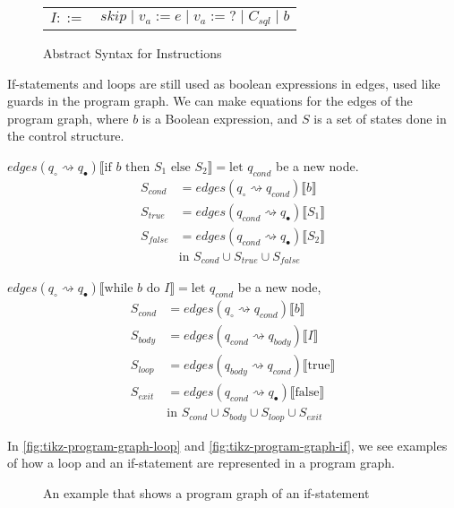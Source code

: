 \begin{figure}
    \center
    \begin{tabular}{r l}
        $I ::=$ & $skip \mid v_a := e \mid v_a := ? \mid C_{sql} \mid b$
    \end{tabular}
    \caption{Abstract Syntax for Instructions}
    \label{tab:abstract-syntax-instructions}
\end{figure}

If-statements and loops are still used as boolean expressions in edges, used like guards in the program graph.
We can make equations for the edges of the program graph, where $b$ is a Boolean expression, and $S$ is a set of states done in the control structure.

$edges(q_{\circ} \rightsquigarrow q_{\bullet})\llbracket \text{if } b \text{ then } S_1 \text{ else } S_2 \rrbracket = \text{let } q_{cond}$ be a new node.
\begin{align}
S_{cond} &= edges(q_\circ \rightsquigarrow q_{cond})\llbracket b \rrbracket \\
S_{true} &= edges(q_{cond} \rightsquigarrow q_{\bullet})\llbracket S_1 \rrbracket \\
    S_{false} &= edges(q_{cond} \rightsquigarrow q_{\bullet})\llbracket S_2 \rrbracket \\
    &\text{in } S_{cond} \cup S_{true} \cup S_{false}
\end{align}

$edges(q_{\circ} \rightsquigarrow q_{\bullet})\llbracket \text{while } b \text{ do } I\rrbracket= \text{let } q_{cond}$ be a new node,
\begin{align}
    S_{cond} &= edges(q_\circ \rightsquigarrow q_{cond}) \llbracket b \rrbracket \\
    S_{body}&=edges(q_{cond} \rightsquigarrow q_{body})\llbracket I \rrbracket \\
    S_{loop} &= edges(q_{body} \rightsquigarrow q_{cond})\llbracket\text{true}\rrbracket \\
    S_{exit} &= edges(q_{cond} \rightsquigarrow q_{\bullet})\llbracket\text{false}\rrbracket \\
    &\text{in } S_{cond} \cup S_{body} \cup S_{loop} \cup S_{exit}
\end{align}

In \autoref{fig:tikz-program-graph-loop} and \autoref{fig:tikz-program-graph-if}, we see examples of how a loop and an if-statement are represented in a program graph.

\begin{figure}[htb!]
    \center
    
    \caption{An example that shows a program graph of an if-statement}
    \label{fig:tikz-program-graph-if}
\end{figure}

